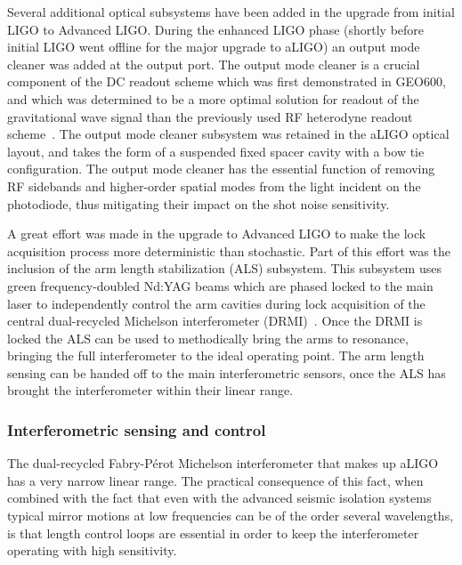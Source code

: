 Several additional optical subsystems have been added in the upgrade from initial LIGO to Advanced LIGO. 
During the enhanced LIGO phase (shortly before initial LIGO went offline for the major upgrade to aLIGO) an output
mode cleaner was added at the output port. The output mode cleaner is a crucial component of the DC readout 
scheme which was first demonstrated in GEO600, and which was determined to be a more optimal solution for 
readout of the gravitational wave signal than the previously used RF heterodyne readout scheme~\cite{DCreadout}. The output mode cleaner subsystem was retained in the aLIGO optical layout, and takes the form of a suspended fixed spacer cavity with a bow tie configuration.
The output mode cleaner has the essential function of removing RF sidebands and higher-order spatial modes from the light incident on the photodiode, thus mitigating their impact on the shot noise sensitivity. 

A great effort was made in the upgrade to Advanced LIGO to make the lock acquisition process more deterministic than stochastic.
Part of this effort was the inclusion of the arm length stabilization (ALS) subsystem.
This subsystem uses green frequency-doubled Nd:YAG beams which are phased locked to the main laser to independently control the arm cavities during lock acquisition of the central dual-recycled Michelson interferometer (DRMI)~\cite{Staley2014}.
Once the DRMI is locked the ALS can be used to methodically bring the arms to resonance, bringing the full interferometer to the ideal operating point. 
The arm length sensing can be handed off to the main interferometric sensors, once the ALS has brought the interferometer within their linear range.

\subsubsection{Interferometric sensing and control}
The dual-recycled Fabry-P\'{e}rot Michelson interferometer that makes up aLIGO has a very narrow linear range. 
The practical consequence of this fact, when combined with the fact that even with the advanced seismic isolation systems typical 
mirror motions at low frequencies can be of the order several wavelengths, is that length control loops are essential in order 
to keep the interferometer operating with high sensitivity. 

